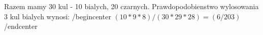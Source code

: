 \medskip
{} 
\medskip

Razem mamy 30 kul - 10 bialych, 20 czarnych.
Prawdopodobienstwo wylosowania 3 kul bialych wynosi:
/begin{center}
  $(10*9*8)/(30*29*28) = (6/203)$
/end{center}
